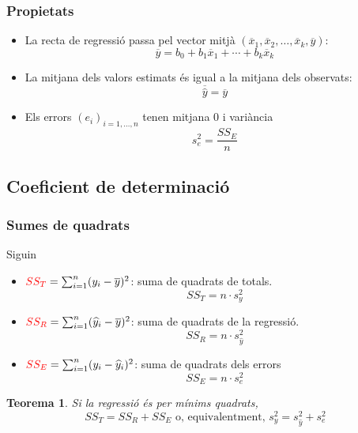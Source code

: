 \documentclass[12pt,t]{beamer}
\newcommand{\red}[1]{\textcolor{red}{#1}}
\theoremstyle{plain}
\newtheorem{teorema}{Teorema}
\theoremstyle{definition}
\begin{document}
\begin{frame}
\frametitle{Propietats}

\begin{itemize}
\item La recta de regressió passa pel vector mitjà
$(\overline{x}_1,\overline{x}_2,\ldots,\overline{x}_k,\overline{y})$:
$$
\overline{y}=b_0+b_1 \overline{x}_1+\cdots+b_k \overline{x}_k
$$

\item La mitjana dels valors estimats és igual a la mitjana dels
observats:
$$
\overline{\widehat{y}}=\overline{y}
$$

\item Els errors $(e_i)_{i=1,\ldots,n}$ tenen mitjana 0 i variància
$$
s_e^2=\frac{SS_E}{n}
$$

\end{itemize}

\end{frame}








\subsection{Coeficient de determinació}
\begin{frame}
\frametitle{Sumes de quadrats}
\vspace*{-2ex}

Siguin
\begin{itemize}
\item $\red{SS_T}=\sum_{i=1}^n (y_i-\overline{y})^2$: suma de quadrats de totals.
$$
SS_T=n\cdot s_y^2
$$

\item $\red{SS_R}=\sum_{i=1}^n(\widehat{y}_i-\overline{y})^2$: suma de quadrats de la regressió.
$$
SS_R=n\cdot s_{\widehat{y}}^2
$$

\item $\red{SS_E}=\sum_{i=1}^n (y_i-\widehat{y}_i)^2$: suma de quadrats dels errors
$$
SS_E=n\cdot s_{e}^2
$$
\end{itemize}
\vspace*{-3ex}


\begin{teorema}
Si la regressió és per mínims quadrats,
$$
SS_T=SS_R+SS_E\mbox{ o, equivalentment, }
s^2_y=s^2_{\widehat{y}}+s^2_e
$$
\end{teorema}
\end{frame}
\end{document}
